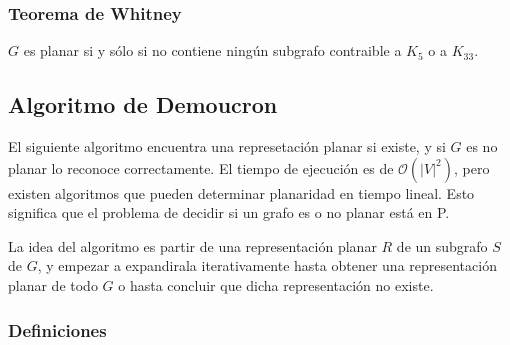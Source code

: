 \subsubsection{Teorema de Whitney}

$G$ es planar si y s\'olo si no contiene ning\'un subgrafo contraible a $K_{5}$ o a $K_{33}$.

\subsection{Algoritmo de Demoucron}

El siguiente algoritmo encuentra una represetaci\'on planar si existe, y si $G$ es no planar lo reconoce correctamente. El tiempo de ejecuci\'on es de $\mathcal{O}(|V|^2)$, pero existen algoritmos que pueden determinar planaridad en tiempo lineal. Esto significa que el problema de decidir si un grafo es o no planar est\'a en P.

La idea del algoritmo es partir de una representaci\'on planar $R$ de un subgrafo $S$ de $G$, y empezar a expandirala iterativamente hasta obtener una representaci\'on planar de todo $G$ o hasta concluir que dicha representaci\'on no existe.

\subsubsection{Definiciones}

